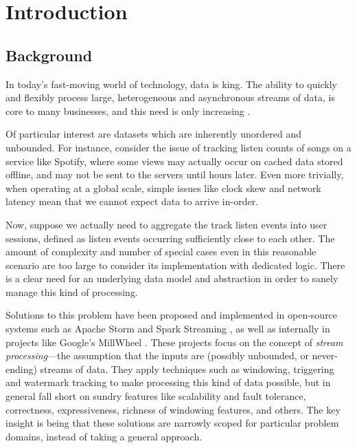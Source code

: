 \chapter{Introduction}\label{ch:intro}

\section{Background}\label{sec:intro:background}

In today's fast-moving world of technology, data is king.
The ability to quickly and flexibly process large, heterogeneous and asynchronous streams of data, is core to many businesses, and this need is only increasing \cite{Yin_2015}\cite{mit_bean_variety}.

Of particular interest are datasets which are inherently unordered and unbounded.
For instance, consider the issue of tracking listen counts of songs on a service like Spotify, where some views may actually occur on cached data stored offline, and may not be sent to the servers until hours later.
Even more trivially, when operating at a global scale, simple issues like clock skew and network latency mean that we cannot expect data to arrive in-order.

Now, suppose we actually need to aggregate the track listen events into user sessions, defined as listen events occurring sufficiently close to each other.
The amount of complexity and number of special cases even in this reasonable scenario are too large to consider its implementation with dedicated logic.
There is a clear need for an underlying data model and abstraction in order to sanely manage this kind of processing.

Solutions to this problem have been proposed and implemented in open-source systems such as Apache Storm \cite{apache_storm} and Spark Streaming \cite{spark:zaharia2013discretized}, as well as internally in projects like Google's MillWheel \cite{akidau2013millwheel}.
These projects focus on the concept of \emph{stream processing}---the assumption that the inputs are (possibly unbounded, or never-ending) streams of data.
They apply techniques such as windowing, triggering and watermark tracking to make processing this kind of data possible, but in general fall short on sundry features like scalability and fault tolerance, correctness, expressiveness, richness of windowing features, and others.
The key insight is being that these solutions are narrowly scoped for particular problem domains, instead of taking a general approach.

